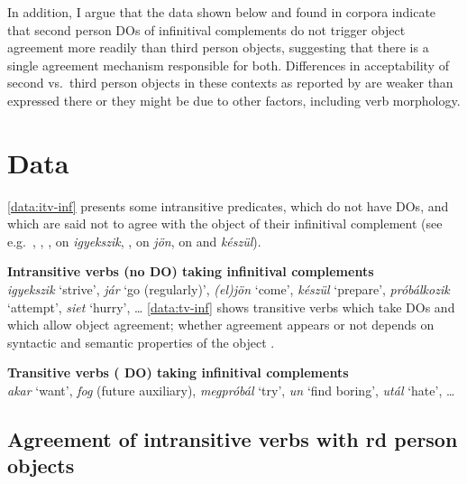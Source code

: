 In addition, I argue that the data shown below and found in corpora indicate
that second person \glspl{DO} of infinitival complements do not trigger object
agreement more readily than third person objects, suggesting that there is a
single agreement mechanism responsible for both. Differences in acceptability
of second vs.\ third person objects in these contexts as reported by
\textcites[227]{EKiss1987}[54]{EKiss2002}[61]{KalmanCetal1989}[451]{denDikken2004}
are weaker than expressed there or they might be due to other factors,
including verb morphology.

\section{Data}\label{sec:data}

\eqref{data:itv-inf} presents some intransitive predicates, which do not have
\Acc{} \glspl{DO}, and which are said not to agree with the \Acc{} object of
their infinitival complement (see e.g.~\citealt[226]{EKiss1987},
\citealt[54]{EKiss2002}, \citealt[60--61]{KalmanCetal1989},
\citealt[79]{SzeSze2018} on \emph{igyekszik}, \citealt[61]{KalmanCetal1989},
\citealt[449, 451]{denDikken2004} on \emph{jön}, \citealt[79]{SzeSze2018} on
and \emph{készül}).

\ex\label{data:itv-inf}\textbf{Intransitive verbs (no \Acc{} \gls{DO}) taking infinitival complements}\\
    \emph{igyekszik} \enquote*{strive}, \emph{jár} \enquote*{go (regularly)},
    \emph{(el)jön} \enquote*{come}, \emph{készül} \enquote*{prepare},
    \emph{próbálkozik} \enquote*{attempt}, \emph{siet} \enquote*{hurry},
    \dots{}
\xe
\eqref{data:tv-inf} shows transitive verbs which take \Acc{} \glspl{DO} and
which allow object agreement; whether agreement appears or not depends on
syntactic and semantic properties of the object
\parencite{Bartos1999,EKiss2002,denDikken2006,CopWec2012b,Coppock2013P,Barany2015d,Barany2017}.

\ex\label{data:tv-inf}\textbf{Transitive verbs (\Acc{} \gls{DO}) taking infinitival complements}\\
    \emph{akar} \enquote*{want}, \emph{fog} (future auxiliary),
    \emph{megpróbál} \enquote*{try}, \emph{un} \enquote*{find boring},
    \emph{utál} \enquote*{hate}, \dots{}
\xe

\subsection{Agreement of intransitive verbs with \Third{}rd person
    objects}\label{sub:agr-3rd}

